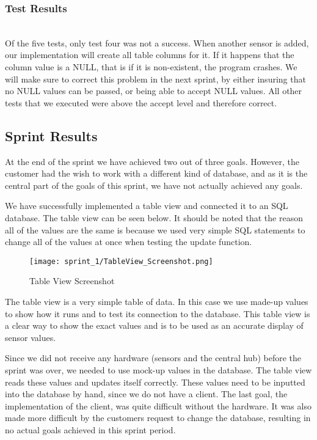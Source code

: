 \documentclass[../document.tex]{subfiles}
\begin{document}
\subsubsection{Test Results} \ \\
Of the five tests, only test four was not a success. When another sensor is added, our implementation will create all table columns for it. If it happens that the column value is a NULL, that is if it is non-existent, the program crashes. We will make sure to correct this problem in the next sprint, by either insuring that no NULL values can be passed, or being able to accept NULL values. All other tests that we executed were above the accept level and therefore correct.

\subsection{Sprint Results}
At the end of the sprint we have achieved two out of three goals. However, the customer had the wish to work with a different kind of database, and as it is the central part of the goals of this sprint, we have not actually achieved any goals.

We have successfully implemented a table view and connected it to an SQL database. The table view can be seen below. It should be noted that the reason all of the values are the same is because we used very simple SQL statements to change all of the values at once when testing the update function.

\begin{figure}
\centering
\caption{Table View Screenshot}
\texttt{[image: sprint\_1/TableView\_Screenshot.png]}
\end{figure}

The table view is a very simple table of data. In this case we use made-up values to show how it runs and to test its connection to the database. This table view is a clear way to show the exact values and is to be used as an accurate display of sensor values. 

Since we did not receive any hardware (sensors and the central hub) before the sprint was over, we needed to use mock-up values in the database. The table view reads these values and updates itself correctly. These values need to be inputted into the database by hand, since we do not have a client. The last goal, the implementation of the client, was quite difficult without the hardware. It was also made more difficult by the customers request to change the database, resulting in no actual goals achieved in this sprint period.
\end{document}
